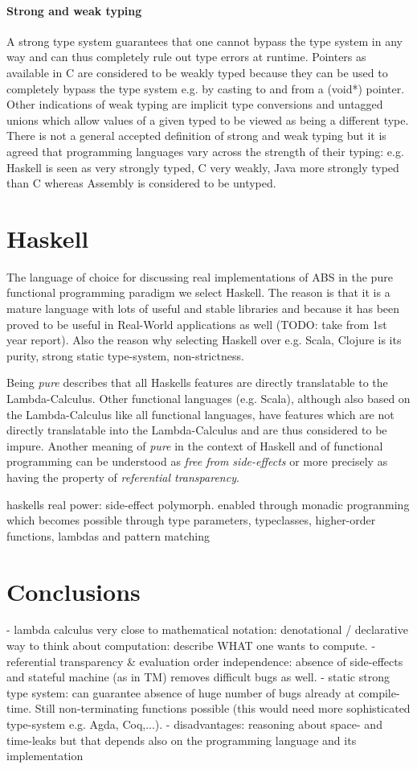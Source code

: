 \paragraph{Strong and weak typing}
A strong type system guarantees that one cannot bypass the type system in any way and can thus completely rule out type errors at runtime. Pointers as available in C are considered to be weakly typed because they can be used to completely bypass the type system e.g. by casting to and from a (void*) pointer. Other indications of weak typing are implicit type conversions and untagged unions which allow values of a given typed to be viewed as being a different type.
There is not a general accepted definition of strong and weak typing but it is agreed that programming languages vary across the strength of their typing: e.g. Haskell is seen as very strongly typed, C very weakly, Java more strongly typed than C whereas Assembly is considered to be untyped.

\section{Haskell}
The language of choice for discussing real implementations of ABS in the pure functional programming paradigm we select Haskell. The reason is that it is a mature language with lots of useful and stable libraries and because it has been proved to be useful in Real-World applications as well (TODO: take from 1st year report). Also the reason why selecting Haskell over e.g. Scala, Clojure is its purity, strong static type-system, non-strictness.

Being \textit{pure} describes that all Haskells features are directly translatable to the Lambda-Calculus. Other functional languages (e.g. Scala), although also based on the Lambda-Calculus like all functional languages, have features which are not directly translatable into the Lambda-Calculus and are thus considered to be impure. Another meaning of \textit{pure} in the context of Haskell and of functional programming can be understood as \textit{free from side-effects} or more precisely as having the property of \textit{referential transparency}. 

haskells real power: side-effect polymorph. enabled through monadic progranming which becomes possible through type parameters, typeclasses, higher-order functions, lambdas and pattern matching

\section{Conclusions}
- lambda calculus very close to mathematical notation: denotational / declarative way to think about computation: describe WHAT one wants to compute.
- referential transparency \& evaluation order independence: absence of side-effects and stateful machine (as in TM) removes difficult bugs as well.
- static strong type system: can guarantee absence of huge number of bugs already at compile-time. Still non-terminating functions possible (this would need more sophisticated type-system e.g. Agda, Coq,...).
- disadvantages: reasoning about space- and time-leaks but that depends also on the programming language and its implementation